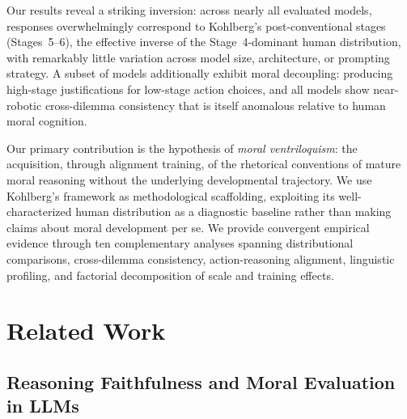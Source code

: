 \documentclass{article}
\begin{document}
Our results reveal a striking inversion: across nearly all evaluated models, responses overwhelmingly correspond to Kohlberg's post-conventional stages (Stages~5--6), the effective inverse of the Stage~4-dominant human distribution, with remarkably little variation across model size, architecture, or prompting strategy. A subset of models additionally exhibit moral decoupling: producing high-stage justifications for low-stage action choices, and all models show near-robotic cross-dilemma consistency that is itself anomalous relative to human moral cognition.

Our primary contribution is the hypothesis of \emph{moral ventriloquism}: the acquisition, through alignment training, of the rhetorical conventions of mature moral reasoning without the underlying developmental trajectory. We use Kohlberg's framework as methodological scaffolding, exploiting its well-characterized human distribution as a diagnostic baseline rather than making claims about moral development per se. We provide convergent empirical evidence through ten complementary analyses spanning distributional comparisons, cross-dilemma consistency, action-reasoning alignment, linguistic profiling, and factorial decomposition of scale and training effects.



\section{Related Work}

\subsection{Reasoning Faithfulness and Moral Evaluation in LLMs}
\end{document}
